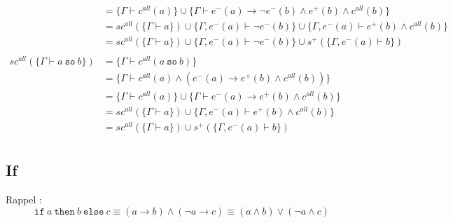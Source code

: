 \documentclass[12pt]{article}
\newcommand{\so}{~\texttt{so}~}
\newcommand{\oif}{\texttt{if}~}
\newcommand{\othen}{~\texttt{then}~}
\newcommand{\oelse}{~\texttt{else}~}
\begin{document}
\begin{align*}
                                       & = \{\Gamma \vdash c^{all}(a) \} \cup \{\Gamma \vdash e^-(a) \rightarrow \neg e^-(b) \land e^+(b) \land c^{all} (b)\}                  \\
                                       & = sc^{all} (\{\Gamma \vdash a \}) \cup \{\Gamma, e^-(a) \vdash \neg e^-(b) \} \cup \{\Gamma, e^-(a) \vdash e^+(b) \land c^{all} (b)\} \\
                                       & = sc^{all} (\{\Gamma \vdash a \}) \cup \{\Gamma, e^-(a) \vdash \neg e^-(b) \} \cup s^+(\{\Gamma, e^-(a) \vdash b\})                   \\
  \\
  sc^{all} (\{\Gamma \vdash a \so b\}) & = \{\Gamma \vdash c^{all}(a \so b)\}                                                                                                  \\
                                       & = \{\Gamma \vdash c^{all}(a) \land (e^-(a) \rightarrow e^+(b) \land c^{all} (b))\}                                                    \\
                                       & = \{\Gamma \vdash c^{all}(a)\} \cup \{\Gamma \vdash e^-(a) \rightarrow e^+(b) \land c^{all} (b)\}                                     \\
                                       & = sc^{all} (\{\Gamma \vdash a\}) \cup \{\Gamma, e^-(a) \vdash e^+(b) \land c^{all} (b)\}                                              \\
                                       & = sc^{all} (\{\Gamma \vdash a\}) \cup s^+(\{\Gamma, e^-(a) \vdash b\})                                                                \\
\end{align*}
\newpage

\subsection*{If}
Rappel :
\[
  \oif a \othen b \oelse c \equiv (a \rightarrow b) \land (\neg a \rightarrow c) \equiv (a \land b) \lor (\neg a \land c)
\]
\end{document}
